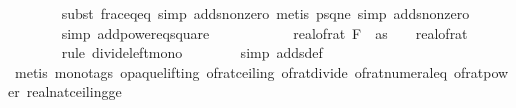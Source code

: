 \begin{isabellebody}
\ \ \ \ \ \ \isamarkupfalse%
\ {\isacharparenleft}{\kern0pt}subst\ frac{\isacharunderscore}{\kern0pt}eq{\isacharunderscore}{\kern0pt}eq{\isacharcomma}{\kern0pt}\ simp\ add{\isacharcolon}{\kern0pt}s{}{\isacharunderscore}{\kern0pt}nonzero{\isacharcomma}{\kern0pt}\ metis\ p{\isacharunderscore}{\kern0pt}sq{\isacharunderscore}{\kern0pt}ne{\isacharunderscore}{\kern0pt}{}{\isacharcomma}{\kern0pt}\ simp\ add{\isacharcolon}{\kern0pt}s{}{\isacharunderscore}{\kern0pt}nonzero{\isacharparenright}{\kern0pt}\isanewline
\ \ \ \ \ \ \isamarkupfalse%
\ {\isacharparenleft}{\kern0pt}simp\ add{\isacharcolon}{\kern0pt}power{}{\isacharunderscore}{\kern0pt}eq{\isacharunderscore}{\kern0pt}square{\isacharparenright}{\kern0pt}\isanewline
\ \ \ \ \isamarkupfalse%
\ \isamarkupfalse%
\ {\isachardoublequoteopen}{\isachardot}{\kern0pt}{\isachardot}{\kern0pt}{\isachardot}{\kern0pt}\ {\isasymle}\ {}\ {\isacharasterisk}{\kern0pt}\ {\isacharparenleft}{\kern0pt}real{\isacharunderscore}{\kern0pt}of{\isacharunderscore}{\kern0pt}rat\ {\isacharparenleft}{\kern0pt}F\ {}\ as{\isacharparenright}{\kern0pt}{\isacharcircum}{\kern0pt}{}{\isacharparenright}{\kern0pt}\ {\isacharslash}{\kern0pt}\ {\isacharparenleft}{\kern0pt}{}\ {\isacharslash}{\kern0pt}\ {\isacharparenleft}{\kern0pt}real{\isacharunderscore}{\kern0pt}of{\isacharunderscore}{\kern0pt}rat\ {\isasymdelta}{\isacharparenright}{\kern0pt}\isanewline
\ \ \ \ \ \ \isamarkupfalse%
\ {\isacharparenleft}{\kern0pt}rule\ divide{\isacharunderscore}{\kern0pt}left{\isacharunderscore}{\kern0pt}mono{\isacharparenright}{\kern0pt}\isanewline
\ \ \ \ \ \ \isamarkupfalse%
\ {\isacharparenleft}{\kern0pt}simp\ add{\isacharcolon}{\kern0pt}sdef{\isacharparenright}{\kern0pt}\ \isanewline
\ \ \ \ \ \ \ \ \isamarkupfalse%
\ {\isacharparenleft}{\kern0pt}metis\ {\isacharparenleft}{\kern0pt}mono{\isacharunderscore}{\kern0pt}tags{\isacharcomma}{\kern0pt}\ opaque{\isacharunderscore}{\kern0pt}lifting{\isacharparenright}{\kern0pt}\ of{\isacharunderscore}{\kern0pt}rat{\isacharunderscore}{\kern0pt}ceiling\ of{\isacharunderscore}{\kern0pt}rat{\isacharunderscore}{\kern0pt}divide\ of{\isacharunderscore}{\kern0pt}rat{\isacharunderscore}{\kern0pt}numeral{\isacharunderscore}{\kern0pt}eq\ of{\isacharunderscore}{\kern0pt}rat{\isacharunderscore}{\kern0pt}power\ real{\isacharunderscore}{\kern0pt}nat{\isacharunderscore}{\kern0pt}ceiling{\isacharunderscore}{\kern0pt}ge{\isacharparenright}{\kern0pt}\isanewline

\end{isabellebody}
